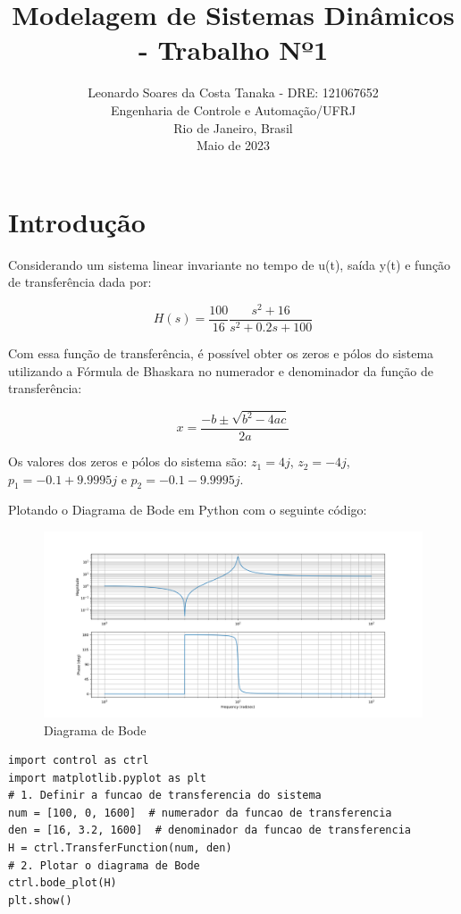 \documentclass[10pt]{article}
\title{Modelagem de Sistemas Dinâmicos - Trabalho Nº1}
\author{
    Leonardo Soares da Costa Tanaka - DRE: 121067652 \\
    Engenharia de Controle e Automação/UFRJ \\
    Rio de Janeiro, Brasil \\
    Maio de 2023
}
\date{}
\begin{document}
\maketitle
\thispagestyle{capa}

\section{Introdução}

\quad Considerando um sistema linear invariante no tempo de u(t), saída y(t) e 
função de transferência dada por:

\begin{equation}
    H(s) = \frac{100}{16} \frac{s^2 + 16}{s^2 + 0.2s + 100}
\end{equation}

\quad Com essa função de transferência,
é possível obter os zeros e pólos do sistema utilizando a Fórmula de Bhaskara no numerador e denominador da função de transferência:

\begin{equation}
    x = \frac{-b \pm \sqrt{b^2 - 4ac}}{2a}
\end{equation}

\quad Os valores dos zeros e pólos do sistema são:
$z_1 = 4j$, $z_2 = -4j$, $p_1 = -0.1 + 9.9995j$ e $p_2 = -0.1 - 9.9995j$.

\quad Plotando o Diagrama de Bode em Python com o seguinte código:

\begin{figure}[h]
    \centering
    \includegraphics[scale=0.4]{bode.png}
    \caption{Diagrama de Bode}
\end{figure}

\begin{lstlisting}
import control as ctrl
import matplotlib.pyplot as plt
# 1. Definir a funcao de transferencia do sistema
num = [100, 0, 1600]  # numerador da funcao de transferencia
den = [16, 3.2, 1600]  # denominador da funcao de transferencia
H = ctrl.TransferFunction(num, den)
# 2. Plotar o diagrama de Bode
ctrl.bode_plot(H)
plt.show()    
\end{lstlisting}
\end{document}
